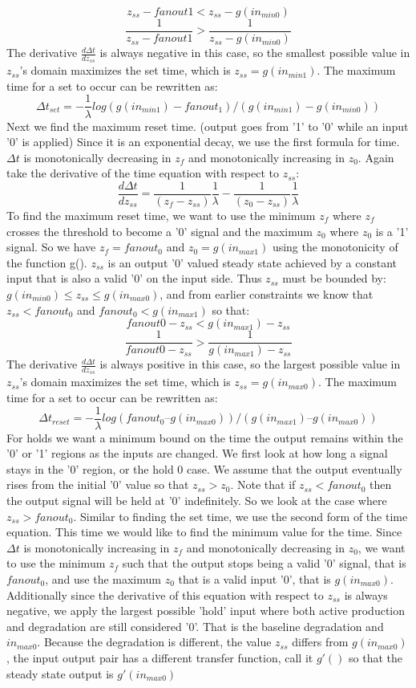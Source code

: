 \documentclass{article}
\begin{document}
\[z_{ss}-fanout1< z_{ss}-g(in_{min0})
\]
\[\frac{1}{z_{ss}-fanout1}>\frac{1}{z_{ss}-g(in_{min0})}
\]
The derivative $\frac{d\Delta t}{dz_{ss}}$ is always negative in this case, so the smallest possible value in $z_{ss}$'s domain maximizes the set time, which is $z_{ss}=g(in_{min1})$.
The maximum time for a set to occur can be rewritten as:
\[\Delta t_{set}= - \frac{1}{\lambda} log(g(in_{min1})-fanout_1)/(g(in_{min1}) -g(in_{min0}))
\]
Next we find the maximum reset time.  (output goes from '1' to '0' while an input '0' is applied)  Since it is an exponential decay, we use the first formula for time.  $\Delta t$ is monotonically decreasing in $z_f$ and monotonically increasing in $z_0$.  Again take the derivative of the time equation with respect to $z_{ss}$:
\[\frac{d\Delta t}{dz_{ss}}= \frac{1}{(z_f-z_{ss})}\frac{1}{\lambda}- \frac{1}{(z_0-z_{ss})}\frac{1}{\lambda}
\]
To find the maximum reset time, we want to use the minimum $z_f$ where $z_f$ crosses the threshold to become a '0' signal and the maximum $z_0$ where $z_0$ is a '1' signal.  So we have $z_f=fanout_0$ and $z_0=g(in_{max1})$ using the monotonicity of the function g().  $z_{ss}$ is an output '0' valued steady state achieved by a constant input that is also a valid '0' on the input side.  Thus $z_{ss}$ must be bounded by: $g(in_{min0})\leq z_{ss}\leq g(in_{max0})$, and from earlier constraints we know that $z_{ss}<fanout_0$ and $fanout_0<g(in_{max1})$ so that:
\[fanout0-z_{ss}< g(in_{max1})-z_{ss}
\]
\[\frac{1}{fanout0-z_{ss}}>\frac{1}{g(in_{max1})-z_{ss}}
\]
The derivative $\frac{d\Delta t}{dz_{ss}}$ is always positive in this case, so the largest possible value in $z_{ss}$'s domain maximizes the set time, which is $z_{ss}=g(in_{max0})$.
The maximum time for a set to occur can be rewritten as:
\[\Delta t_{reset}= -\frac{1}{\lambda} log(fanout_0 –g(in_{max0}))/(g(in_{max1}) – g(in_{max0}))
\]
For holds we want a minimum bound on the time the output remains within the '0' or '1' regions as the inputs are changed.  We first look at how long a signal stays in the '0' region, or the hold 0 case.  We assume that the output eventually rises from the initial '0' value so that $z_{ss}>z_0$.  Note that if $z_{ss}<fanout_0$ then the output signal will be held at '0' indefinitely.  So we look at the case where $z_{ss}>fanout_0$.  Similar to finding the set time, we use the second form of the time equation.  This time we would like to find the minimum value for the time.  Since $\Delta t$ is monotonically increasing in $z_f$ and monotonically decreasing in $z_0$, we want to use the minimum $z_f$ such that the output stops being a valid '0' signal, that is $fanout_0$, and use the maximum $z_0$ that is a valid input '0', that is $g(in_{max0})$.  Additionally since the derivative of this equation with respect to $z_{ss}$ is always negative, we apply the largest possible 'hold' input where both active production and degradation are still considered '0'.  That is the baseline degradation and $in_{max0}$.  Because the degradation is different, the value $z_{ss}$ differs from $g(in_{max0})$, the input output pair has a different transfer function, call it $g'()$ so that the steady state output is $g'(in_{max0})$
\end{document}
